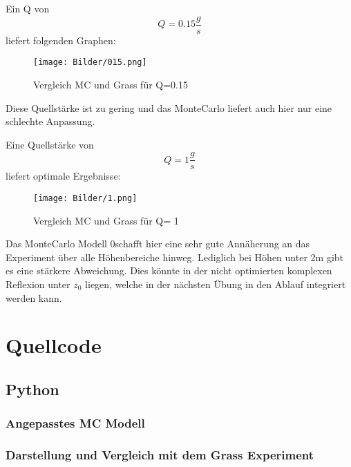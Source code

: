 \documentclass[ngerman]{scrartcl}
\begin{document}
Ein Q von
\begin{equation}
Q= 0.15 \frac{g}{s}
\end{equation}
 liefert folgenden Graphen:
\begin{figure}[H]
    \centering
    \texttt{[image: Bilder/015.png]}
    \caption{Vergleich MC und Grass für Q=0.15}
    \label{fig:my_label}
\end{figure}
Diese Quellstärke ist zu gering und das MonteCarlo liefert auch hier nur eine schlechte Anpassung.

Eine Quellstärke von 
\begin{equation}
Q= 1 \frac{g}{s}
\end{equation}
liefert optimale Ergebnisse:
\begin{figure}[H]
    \centering
    \texttt{[image: Bilder/1.png]}
    \caption{Vergleich MC und Grass für Q= 1}
    \label{fig:my_label}
\end{figure}

Das MonteCarlo Modell 0schafft hier eine sehr gute Annäherung an das Experiment über alle Höhenbereiche hinweg. Lediglich bei Höhen unter 2m gibt es eine stärkere Abweichung. Dies könnte in der nicht optimierten komplexen Reflexion unter $z_{0}$ liegen, welche in der nächsten Übung in den Ablauf integriert werden kann.


\section{Quellcode}
\subsection{Python}
\subsubsection{Angepasstes MC Modell}

\subsubsection{Darstellung und Vergleich mit dem Grass Experiment}

\end{document}
